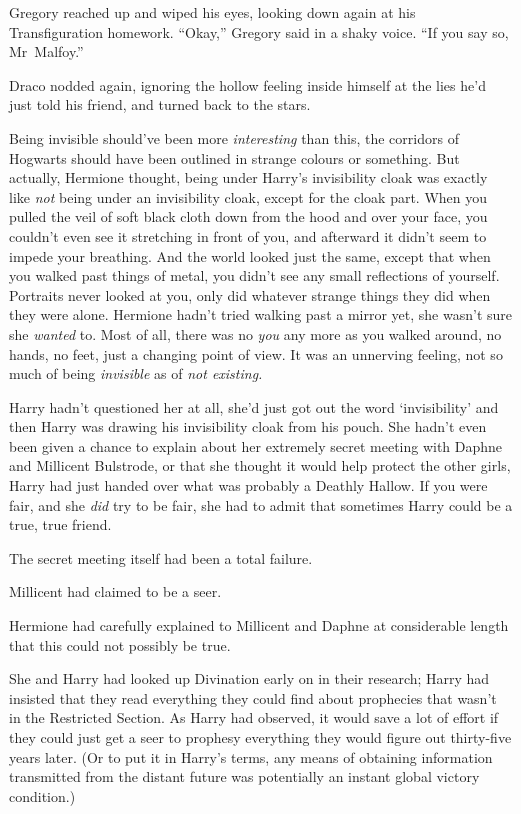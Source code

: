 Gregory reached up and wiped his eyes, looking down again at his
Transfiguration homework. “Okay,” Gregory said in a shaky voice. “If you say
so, Mr~Malfoy.”

Draco nodded again, ignoring the hollow feeling inside himself at the lies he’d
just told his friend, and turned back to the stars.

Being invisible should’ve been more \emph{interesting} than this, the corridors
of Hogwarts should have been outlined in strange colours or something. But
actually, Hermione thought, being under Harry’s invisibility cloak was exactly
like \emph{not} being under an invisibility cloak, except for the cloak part.
When you pulled the veil of soft black cloth down from the hood and over your
face, you couldn’t even see it stretching in front of you, and afterward it
didn’t seem to impede your breathing. And the world looked just the same,
except that when you walked past things of metal, you didn’t see any small
reflections of yourself. Portraits never looked at you, only did whatever
strange things they did when they were alone. Hermione hadn’t tried walking
past a mirror yet, she wasn’t sure she \emph{wanted} to. Most of all, there was
no \emph{you} any more as you walked around, no hands, no feet, just a changing
point of view. It was an unnerving feeling, not so much of being
\emph{invisible} as of \emph{not existing.}

Harry hadn’t questioned her at all, she’d just got out the word ‘invisibility’
and then Harry was drawing his invisibility cloak from his pouch. She hadn’t
even been given a chance to explain about her extremely secret meeting with
Daphne and Millicent Bulstrode, or that she thought it would help protect the
other girls, Harry had just handed over what was probably a Deathly Hallow. If
you were fair, and she \emph{did} try to be fair, she had to admit that
sometimes Harry could be a true, true friend.

The secret meeting itself had been a total failure.

Millicent had claimed to be a seer.

Hermione had carefully explained to Millicent and Daphne at considerable length
that this could not possibly be true.

She and Harry had looked up Divination early on in their research; Harry had
insisted that they read everything they could find about prophecies that wasn’t
in the Restricted Section. As Harry had observed, it would save a lot of effort
if they could just get a seer to prophesy everything they would figure out
thirty-five years later. (Or to put it in Harry’s terms, any means of obtaining
information transmitted from the distant future was potentially an instant
global victory condition.)

